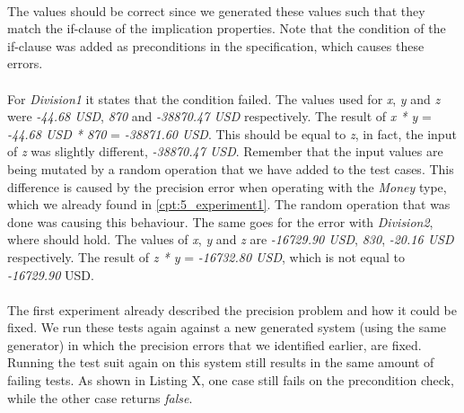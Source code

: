 \\
The values should be correct since we generated these values such that they match the if-clause of the implication properties. Note that the condition of the if-clause was added as preconditions in the specification, which causes these errors.\\
\\
For \textit{Division1} it states that the condition  failed. The values used for \textit{x}, \textit{y} and \textit{z} were \textit{-44.68 USD}, \textit{870} and \textit{-38870.47 USD} respectively. The result of \textit{x * y} = \textit{-44.68 USD * 870} = \textit{-38871.60 USD}. This should be equal to \textit{z}, in fact, the input of \textit{z} was slightly different, \textit{-38870.47 USD}. Remember that the input values are being mutated by a random operation that we have added to the test cases. This difference is caused by the precision error when operating with the \textit{Money} type, which we already found in \autoref{cpt:5_experiment1}. The random operation that was done was causing this behaviour. The same goes for the error with \textit{Division2}, where  should hold. The values of \textit{x}, \textit{y} and \textit{z} are \textit{-16729.90 USD}, \textit{830}, \textit{-20.16 USD} respectively. The result of \textit{z * y} = \textit{-16732.80 USD}, which is not equal to \textit{-16729.90} USD.\\
\\
The first experiment already described the precision problem and how it could be fixed. We run these tests again against a new generated system (using the same generator) in which the precision errors that we identified earlier, are fixed. Running the test suit again on this system still results in the same amount of failing tests. As shown in Listing X, one case still fails on the precondition check, while the other case returns \textit{false}.

